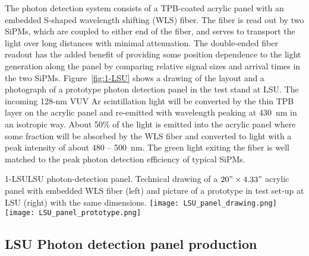 The photon detection system consists of a TPB-coated acrylic panel
with an embedded S-shaped wavelength shifting (WLS) fiber. The fiber
is read out by two SiPMs, which are coupled to either end of the fiber,
and serves to transport the light over long distances with minimal
attenuation. The double-ended fiber readout has the added benefit of
providing some position dependence to the light generation along the
panel by comparing relative signal sizes and arrival times in the two
SiPMs. Figure~\ref{fig:1-LSU} shows a drawing of the layout and a
photograph of a prototype photon detection panel in the test stand at
LSU.  The incoming 128-nm VUV Ar scintillation light will be converted
by the thin TPB layer on the acrylic panel and re-emitted with
wavelength peaking at 430~nm in an isotropic way. About 50\% of the
light %
is emitted into the acrylic panel where some fraction will
be absorbed by the WLS fiber and converted to light with a peak
intensity of about 480 -- 500~nm. The green light exiting the fiber is
well matched to the peak photon detection efficiency of typical SiPMs.

\begin{cdrfigure}{1-LSU}{LSU photon-detection panel. Technical drawing of a $20"\times4.33"$ acrylic panel with embedded WLS fiber (left) and picture of a prototype in test set-up at LSU (right) with the same dimensions.}
\texttt{[image: LSU\_panel\_drawing.png]}
\texttt{[image: LSU\_panel\_prototype.png]}
\end{cdrfigure}



\subsection{LSU Photon detection panel production}

